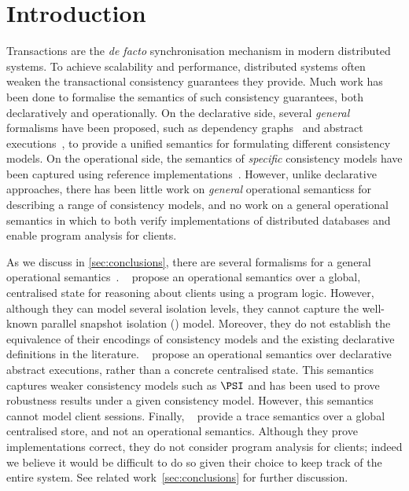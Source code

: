 \section{Introduction}
Transactions are the \emph{de facto} synchronisation mechanism in modern distributed systems.
To achieve scalability and performance, distributed systems often weaken the transactional consistency guarantees they provide. 
%
%
Much work has been done to formalise the semantics of such consistency guarantees, both
declaratively and operationally.
On the declarative side, several \emph{general} formalisms have been proposed, 
such as dependency graphs~\cite{adya} and abstract executions~\cite{framework-concur}, to provide a unified
semantics for formulating different consistency models.  
On the operational side, the semantics of \emph{specific} consistency models have
been captured using reference implementations~\cite{si,PSI,PSI-RA}. 
However, unlike declarative approaches, there has been
little work on \emph{general} operational semanticss for describing a range
of consistency models, and no work on a general operational semantics
in which to both verify implementations of distributed databases and 
enable program analysis for clients.

As we discuss in \cref{sec:conclusions}, there are several formalisms for a general operational semantics~\cite{sureshConcur,alonetogether,seebelieve}. 
\citeauthor{alonetogether}~\cite{alonetogether} propose an operational semantics over a global, centralised state for reasoning about clients using a program logic. 
However, although they can model several isolation levels, they cannot capture the well-known
parallel snapshot isolation (\PSI) model. 
Moreover, they do not establish the equivalence of their encodings of consistency models 
and the existing declarative definitions in the literature. 
\citeauthor{sureshConcur}~\cite{sureshConcur} propose an operational semantics over declarative abstract executions, rather than a concrete centralised state. This semantics captures weaker consistency models
such as \(\PSI\) and has been used to prove robustness results under a given consistency model.  
However, this semantics cannot model client sessions.
Finally, \citeauthor{seebelieve}~\cite{seebelieve} provide a trace semantics over a global
centralised store, and not an operational semantics. 
Although they prove implementations correct, they do not consider program analysis for clients;
indeed we believe it would be difficult to do so given their choice to
keep track of the entire system.
See related work~\cref{sec:conclusions} for further discussion. 




